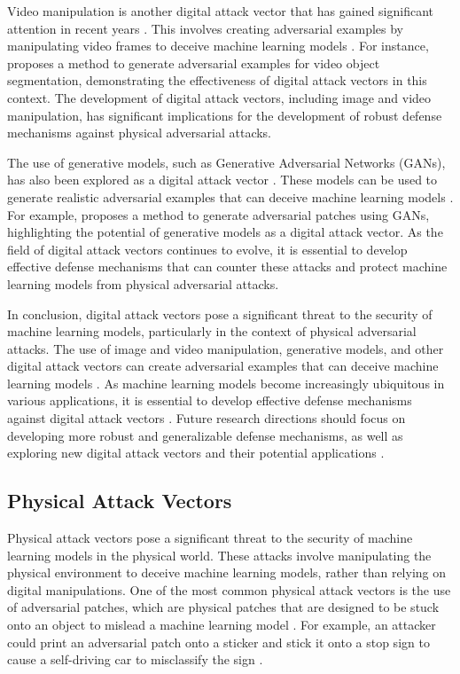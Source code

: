 \documentclass[11pt,a4paper]{article}
\begin{document}
Video manipulation is another digital attack vector that has gained significant attention in recent years \cite{doi:10.1109/tcsvt.2023.3341170}. This involves creating adversarial examples by manipulating video frames to deceive machine learning models \cite{doi:10.1007/s44267-024-00066-7}. For instance, \cite{doi:10.1109/tcsvt.2023.3341170} proposes a method to generate adversarial examples for video object segmentation, demonstrating the effectiveness of digital attack vectors in this context. The development of digital attack vectors, including image and video manipulation, has significant implications for the development of robust defense mechanisms against physical adversarial attacks.

The use of generative models, such as Generative Adversarial Networks (GANs), has also been explored as a digital attack vector \cite{doi:10.1109/cvpr46437.2021.01167}. These models can be used to generate realistic adversarial examples that can deceive machine learning models \cite{doi:10.3390/s23020853}. For example, \cite{doi:10.1007/978-3-030-58574-7_41} proposes a method to generate adversarial patches using GANs, highlighting the potential of generative models as a digital attack vector. As the field of digital attack vectors continues to evolve, it is essential to develop effective defense mechanisms that can counter these attacks and protect machine learning models from physical adversarial attacks.

In conclusion, digital attack vectors pose a significant threat to the security of machine learning models, particularly in the context of physical adversarial attacks. The use of image and video manipulation, generative models, and other digital attack vectors can create adversarial examples that can deceive machine learning models \cite{doi:10.1007/s11633-019-1211-x}. As machine learning models become increasingly ubiquitous in various applications, it is essential to develop effective defense mechanisms against digital attack vectors \cite{arxiv:1902.06705}. Future research directions should focus on developing more robust and generalizable defense mechanisms, as well as exploring new digital attack vectors and their potential applications \cite{doi:10.1049/cit2.12028}.


\subsection{Physical Attack Vectors}


Physical attack vectors pose a significant threat to the security of machine learning models in the physical world. These attacks involve manipulating the physical environment to deceive machine learning models, rather than relying on digital manipulations. One of the most common physical attack vectors is the use of adversarial patches, which are physical patches that are designed to be stuck onto an object to mislead a machine learning model \cite{arxiv:1707.07397}. For example, an attacker could print an adversarial patch onto a sticker and stick it onto a stop sign to cause a self-driving car to misclassify the sign \cite{doi:10.1201/9781351251389-8}.
\end{document}
